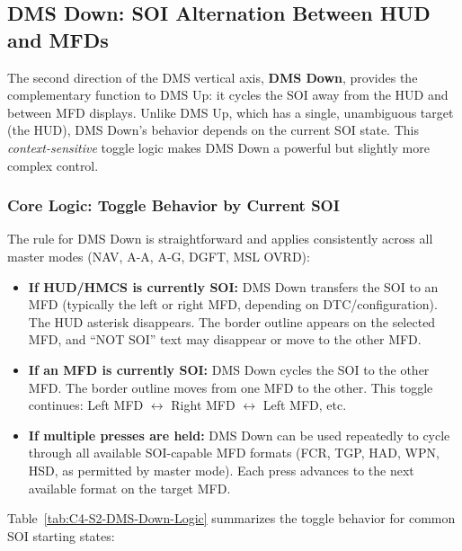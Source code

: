 \documentclass[11pt,a4paper]{article}
\begin{document}
\subsection{DMS Down: SOI Alternation Between HUD and MFDs}

\label{sec:C4-S2-S2}

The second direction of the DMS vertical axis, \textbf{DMS Down}, provides the complementary function to DMS Up: it cycles the SOI away from the HUD and between MFD displays. Unlike DMS Up, which has a single, unambiguous target (the HUD), DMS Down's behavior depends on the current SOI state. This \textit{context-sensitive} toggle logic makes DMS Down a powerful but slightly more complex control.

\subsubsection{Core Logic: Toggle Behavior by Current SOI}

The rule for DMS Down is straightforward and applies consistently across all master modes (NAV, A-A, A-G, DGFT, MSL OVRD):

\begin{itemize}

\item \textbf{If HUD/HMCS is currently SOI:} DMS Down transfers the SOI to an MFD (typically the left or right MFD, depending on DTC/configuration). The HUD asterisk disappears. The border outline appears on the selected MFD, and ``NOT SOI'' text may disappear or move to the other MFD.

\item \textbf{If an MFD is currently SOI:} DMS Down cycles the SOI to the other MFD. The border outline moves from one MFD to the other. This toggle continues: Left MFD $\leftrightarrow$ Right MFD $\leftrightarrow$ Left MFD, etc.

\item \textbf{If multiple presses are held:} DMS Down can be used repeatedly to cycle through all available SOI-capable MFD formats (FCR, TGP, HAD, WPN, HSD, as permitted by master mode). Each press advances to the next available format on the target MFD.

\end{itemize}

Table~\ref{tab:C4-S2-DMS-Down-Logic} summarizes the toggle behavior for common SOI starting states:
\end{document}
